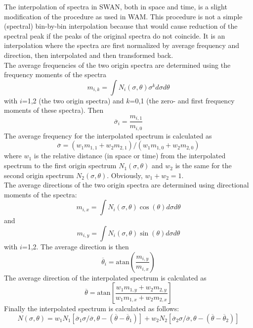 \documentclass[12pt]{book}
\begin{document}
The interpolation of spectra in SWAN, both in space and time, is a slight modification of the procedure
as used in WAM. This procedure is not a simple (spectral) bin-by-bin interpolation because that would cause
reduction of the spectral peak if the peaks of the original spectra do not coincide. It is an interpolation
where the spectra are first normalized by average frequency and direction, then interpolated and then
transformed back.
\\[2ex]
The average frequencies of the two origin spectra are determined using the frequency moments of the
spectra
\begin{equation}
  m_{i,k} = \int N_{i} (\sigma,\theta)\sigma^k d\sigma d\theta
\end{equation}
with $i$=1,2 (the two origin
spectra) and $k$=0,1 (the zero- and first frequency moments of these spectra). Then
\begin{equation}
  \overline{\sigma}_{i} = \frac{m_{i,1}}{m_{i,0}}
\end{equation}
The average frequency for the interpolated spectrum
is calculated as
\begin{equation}
  \overline{\sigma} = (w_{1} m_{1,1} + w_{2} m_{2,1})/(w_{1} m_{1,0} + w_{2} m_{2,0})
\end{equation}
where $w_{1}$ is the relative distance (in space or time) from the interpolated spectrum to the first
origin spectrum $N_{1}(\sigma,\theta)$ and $w_{2}$ is the same for the second origin spectrum
$N_{2}(\sigma,\theta)$. Obviously, $w_{1} + w_{2} = 1$.
\\[2ex]
The average directions of the two origin spectra are determined using directional moments of the spectra:
\begin{equation}
  m_{i,x} = \int N_{i} (\sigma,\theta) \cos (\theta) d\sigma d\theta
\end{equation}
and
\begin{equation}
  m_{i,y} = \int N_{i} (\sigma,\theta) \sin (\theta) d\sigma d\theta
\end{equation}
with $i$=1,2. The average direction is then
\begin{equation}
  {\overline{\theta}}_{i} = \mbox{atan} (\frac{m_{i,y}}{m_{i,x}})
\end{equation}
The average direction of the interpolated spectrum is calculated as
\begin{equation}
  \overline{\theta} = \mbox{atan} [\frac{w_{1} m_{1,y} + w_{2} m_{2,y}}{w_{1} m_{1,x} + w_{2} m_{2,x}}]
\end{equation}
Finally the interpolated spectrum is calculated as follows:
\begin{equation}
  N(\sigma,\theta) = w_{1} N_{1} [\overline{\sigma}_{1} \sigma/\overline{\sigma}, \theta -
  (\overline{\theta} - {\overline{\theta}}_{1} ) ] + w_{2} N _{2} [{\overline{\sigma}}_{2} \sigma /
  \overline{\sigma}, \theta - (\overline{\theta}-{\overline{\theta}}_{2})]
\end{equation}
\end{document}

